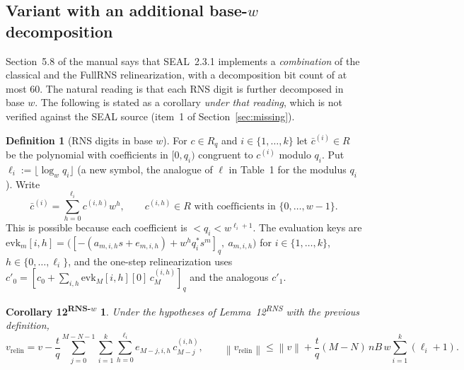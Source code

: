 \documentclass[11pt]{article}
\newcommand{\norm}[1]{\left\lVert #1\right\rVert}
\newcommand{\vrelin}{v_{\mathrm{relin}}}
\newcommand{\qstar}[1]{q^{*}_{#1}}
\theoremstyle{plain}
\newtheorem*{corollaryRNS}{Corollary 12\textsuperscript{RNS-$w$}}
\theoremstyle{definition}
\newtheorem*{definition*}{Definition}
\theoremstyle{remark}
\begin{document}
\subsection{Variant with an additional base-$w$ decomposition}

Section~5.8 of the manual says that SEAL~2.3.1 implements a \emph{combination} of the classical
and the FullRNS relinearization, with a decomposition bit count of at most $60$. The natural
reading is that each RNS digit is further decomposed in base $w$. The following is stated
as a corollary \emph{under that reading}, which is not verified against the SEAL source (item~1 of
Section~\ref{sec:missing}).

\begin{definition*}[RNS digits in base $w$]
For $c\in R_q$ and $i\in\{1,\dots,k\}$ let $\bar c^{(i)}\in R$ be the polynomial with coefficients
in $[0,q_i)$ congruent to $c^{(i)}$ modulo $q_i$. Put $\ell_i:=\lfloor\log_wq_i\rfloor$ (a new symbol, the
analogue of $\ell$ in Table~1 for the modulus $q_i$). Write
\[
 \bar c^{(i)}=\sum_{h=0}^{\ell_i}c^{(i,h)}w^h,\qquad c^{(i,h)}\in R\text{ with coefficients in }\{0,\dots,w-1\}.
\]
This is possible because each coefficient is $<q_i<w^{\ell_i+1}$. The evaluation keys are
$\mathrm{evk}_m[i,h]=\bigl([-(a_{m,i,h}s+e_{m,i,h})+w^h\qstar{i}s^m]_q,\ a_{m,i,h}\bigr)$ for
$i\in\{1,\dots,k\}$, $h\in\{0,\dots,\ell_i\}$, and the one-step relinearization uses
$c'_0=[c_0+\sum_{i,h}\mathrm{evk}_M[i,h][0]\,c_M^{(i,h)}]_q$ and the analogous $c'_1$.
\end{definition*}

\begin{corollaryRNS}
Under the hypotheses of Lemma~12\textsuperscript{RNS} with the previous definition,
\[
 \vrelin=v-\frac{t}{q}\sum_{j=0}^{M-N-1}\sum_{i=1}^{k}\sum_{h=0}^{\ell_i}e_{M-j,i,h}\,c_{M-j}^{(i,h)},
 \qquad
 \norm{\vrelin}\leq\norm{v}+\frac{t}{q}(M-N)\,nB\,w\sum_{i=1}^{k}(\ell_i+1).
\]
\end{corollaryRNS}
\end{document}
